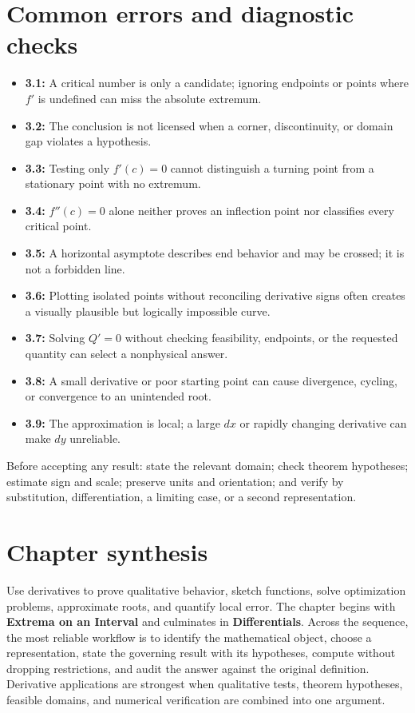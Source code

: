 \documentclass[11pt]{article}
\begin{document}
\section{Common errors and diagnostic checks}
\begin{warningbox}
\begin{itemize}
\item \textbf{3.1:} A critical number is only a candidate; ignoring endpoints or points where $f'$ is undefined can miss the absolute extremum.
\item \textbf{3.2:} The conclusion is not licensed when a corner, discontinuity, or domain gap violates a hypothesis.
\item \textbf{3.3:} Testing only $f'(c)=0$ cannot distinguish a turning point from a stationary point with no extremum.
\item \textbf{3.4:} $f''(c)=0$ alone neither proves an inflection point nor classifies every critical point.
\item \textbf{3.5:} A horizontal asymptote describes end behavior and may be crossed; it is not a forbidden line.
\item \textbf{3.6:} Plotting isolated points without reconciling derivative signs often creates a visually plausible but logically impossible curve.
\item \textbf{3.7:} Solving $Q'=0$ without checking feasibility, endpoints, or the requested quantity can select a nonphysical answer.
\item \textbf{3.8:} A small derivative or poor starting point can cause divergence, cycling, or convergence to an unintended root.
\item \textbf{3.9:} The approximation is local; a large $dx$ or rapidly changing derivative can make $dy$ unreliable.
\end{itemize}
\end{warningbox}
\begin{checkbox}
Before accepting any result: state the relevant domain; check theorem hypotheses; estimate sign and scale; preserve units and orientation; and verify by substitution, differentiation, a limiting case, or a second representation.
\end{checkbox}

\section{Chapter synthesis}
Use derivatives to prove qualitative behavior, sketch functions, solve optimization problems, approximate roots, and quantify local error. The chapter begins with \textbf{Extrema on an Interval} and culminates in \textbf{Differentials}. Across the sequence, the most reliable workflow is to identify the mathematical object, choose a representation, state the governing result with its hypotheses, compute without dropping restrictions, and audit the answer against the original definition. Derivative applications are strongest when qualitative tests, theorem hypotheses, feasible domains, and numerical verification are combined into one argument.
\end{document}

